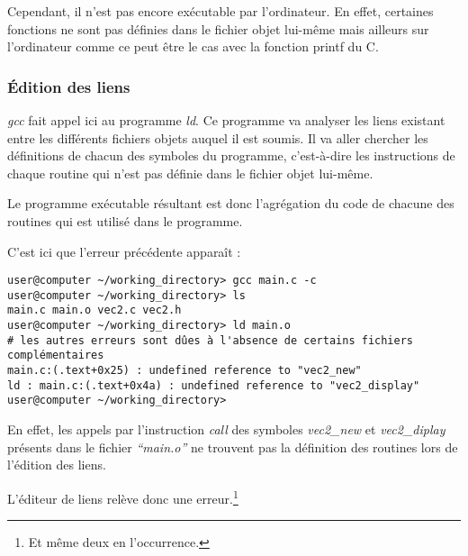 \documentclass[../../../main.tex]{subfiles}
\begin{document}
Cependant, il n'est pas encore exécutable par l'ordinateur. En effet, certaines fonctions ne sont pas définies dans le fichier objet lui-même mais ailleurs sur l'ordinateur comme ce peut être le cas avec la fonction \textsf{printf} du C.
\subsubsection{Édition des liens}
\label{ssub:_dition_des_liens}
\textit{gcc} fait appel ici au programme \textit{ld}. Ce programme va analyser les liens existant entre les différents fichiers objets auquel il est soumis. Il va aller chercher les définitions de chacun des symboles du programme, c'est-à-dire les instructions de chaque routine qui n'est pas définie dans le fichier objet lui-même.

\begin{minipage}{\textwidth}
	\begin{center}
		
	\end{center}
\end{minipage}

Le programme exécutable résultant est donc l'agrégation du code de chacune des routines qui est utilisé dans le programme.
 
C'est ici que l'erreur précédente apparaît :
\begin{verbatim}
user@computer ~/working_directory> gcc main.c -c
user@computer ~/working_directory> ls
main.c main.o vec2.c vec2.h
user@computer ~/working_directory> ld main.o
# les autres erreurs sont dûes à l'absence de certains fichiers complémentaires
main.c:(.text+0x25) : undefined reference to "vec2_new"
ld : main.c:(.text+0x4a) : undefined reference to "vec2_display"
user@computer ~/working_directory> 
\end{verbatim}
En effet, les appels par l'instruction \textit{call} des symboles \textit{vec2\_new} et \textit{vec2\_diplay} présents dans le fichier \textit{``main.o''} ne trouvent pas la définition des routines lors de l'édition des liens.

L'éditeur de liens relève donc une erreur.\footnote{Et même deux en l'occurrence.}
\end{document}
